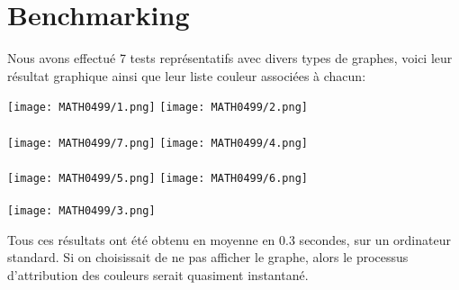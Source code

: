 \documentclass[a4paper, 11pt, oneside]{article}
\begin{document}
\section{Benchmarking}

Nous avons effectué 7 tests représentatifs avec divers types de graphes,
voici leur résultat graphique ainsi que leur liste couleur associées à chacun:

\texttt{[image: MATH0499/1.png]}
\texttt{[image: MATH0499/2.png]}
\\
\\
\texttt{[image: MATH0499/7.png]}
\texttt{[image: MATH0499/4.png]}
\\
\\
\texttt{[image: MATH0499/5.png]}
\texttt{[image: MATH0499/6.png]}
\\
\\
\texttt{[image: MATH0499/3.png]}

Tous ces résultats ont été obtenu en moyenne en 0.3 secondes, sur un ordinateur standard. Si on choisissait de ne pas afficher le graphe, alors le processus d'attribution des couleurs serait quasiment instantané.
\end{document}
